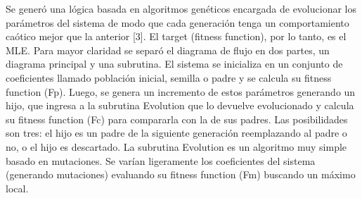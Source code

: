 Se generó una lógica basada en algoritmos genéticos encargada de evolucionar los
parámetros del sistema de modo que cada generación tenga un comportamiento
caótico mejor que la anterior [3]. El target (fitness function), por lo tanto, es el MLE.
Para mayor claridad se separó el diagrama de flujo en dos partes, un diagrama principal
y una subrutina.
El sistema se inicializa en un conjunto de coeficientes llamado población inicial,
semilla o padre y se calcula su fitness function (Fp). Luego, se genera un incremento de
estos parámetros generando un hijo, que ingresa a la subrutina Evolution que lo
devuelve evolucionado y calcula su fitness function (Fc) para compararla con la de sus
padres. Las posibilidades son tres: el hijo es un padre de la siguiente generación
reemplazando al padre o no, o el hijo es descartado.
La subrutina Evolution es un algoritmo muy simple basado en mutaciones. Se
varían ligeramente los coeficientes del sistema (generando mutaciones) evaluando su
fitness function (Fm) buscando un máximo local.
